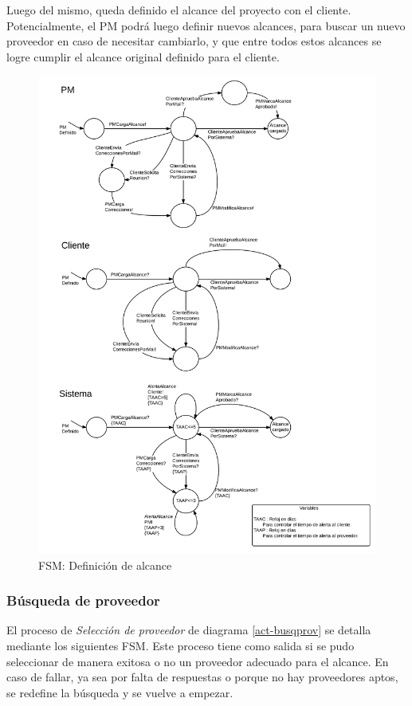 Luego del mismo, queda definido el alcance del proyecto con el cliente. 
Potencialmente, el PM podrá luego definir nuevos alcances, para buscar un nuevo 
proveedor en caso de necesitar cambiarlo, y que entre todos estos alcances 
se logre cumplir el alcance original definido para el cliente. 

\begin{figure}[H]
\centering
\includegraphics[width=0.8\linewidth]{diag/nuevos/fsm-alcance.png}
\caption{FSM: Definición de alcance}
\label{fsm-alcance}
\end{figure}


		\subsubsection{Búsqueda de proveedor}
El proceso de \textit{Selección de proveedor} de diagrama \ref{act-busqprov} se detalla mediante 
los siguientes FSM. Este proceso tiene como salida si se pudo seleccionar de 
manera exitosa o no un proveedor adecuado para el alcance. En caso de fallar, ya sea 
por falta de respuestas o porque no hay proveedores aptos, se redefine la búsqueda y 
se vuelve a empezar. 

